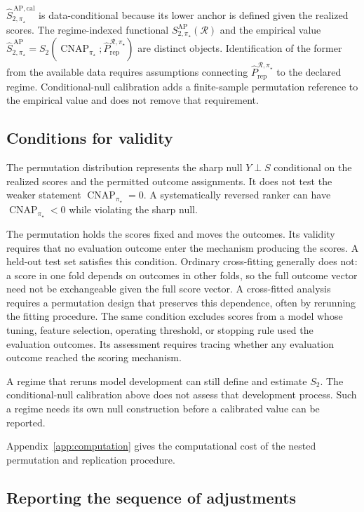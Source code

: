 \documentclass[11pt]{article}
\newcommand{\CNAP}{\operatorname{CNAP}}
\newcommand{\Regime}{\mathcal{R}}
\newcommand{\SAPfull}{S_{2,\pi_\star}^{\mathrm{AP}}(\Regime)}
\newcommand{\SAPHat}{\widehat S_{2,\pi_\star}^{\,\mathrm{AP}}}
\newcommand{\SAPcalHat}{\widehat S_{2,\pi_\star}^{\,\mathrm{AP,cal}}}
\newcommand{\PRepHat}{\widehat{P}_{\mathrm{rep}}^{\Regime,\pi_\star}}
\theoremstyle{remark}
\begin{document}
$\SAPcalHat$ is data-conditional because its lower anchor is defined given the realized scores. The regime-indexed functional $\SAPfull$ and the empirical value $\SAPHat=S_2(\CNAP_{\pi_\star};\PRepHat)$ are distinct objects. Identification of the former from the available data requires assumptions connecting $\PRepHat$ to the declared regime. Conditional-null calibration adds a finite-sample permutation reference to the empirical value and does not remove that requirement.

\subsection{Conditions for validity}
\label{sec:caveats}

The permutation distribution represents the sharp null $Y\perp S$ conditional on the realized scores and the permitted outcome assignments. It does not test the weaker statement $\CNAP_{\pi_\star}=0$. A systematically reversed ranker can have $\CNAP_{\pi_\star}<0$ while violating the sharp null.

The permutation holds the scores fixed and moves the outcomes. Its validity requires that no evaluation outcome enter the mechanism producing the scores. A held-out test set satisfies this condition. Ordinary cross-fitting generally does not: a score in one fold depends on outcomes in other folds, so the full outcome vector need not be exchangeable given the full score vector. A cross-fitted analysis requires a permutation design that preserves this dependence, often by rerunning the fitting procedure. The same condition excludes scores from a model whose tuning, feature selection, operating threshold, or stopping rule used the evaluation outcomes. Its assessment requires tracing whether any evaluation outcome reached the scoring mechanism.

A regime that reruns model development can still define and estimate $S_2$. The conditional-null calibration above does not assess that development process. Such a regime needs its own null construction before a calibrated value can be reported.

Appendix~\ref{app:computation} gives the computational cost of the nested permutation and replication procedure.

\subsection{Reporting the sequence of adjustments}
\label{sec:reporting}
\end{document}

